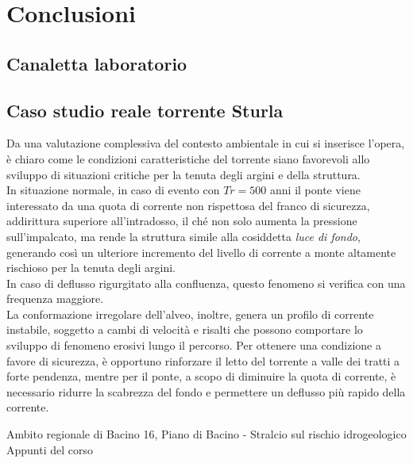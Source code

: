 \documentclass[12pt]{article} %
\begin{document}
\newpage
\section{Conclusioni}

\subsection{Canaletta laboratorio}

\subsection{Caso studio reale torrente Sturla}

\noindent Da una valutazione complessiva del contesto ambientale in cui si inserisce l'opera, è chiaro come le condizioni caratteristiche del torrente siano favorevoli allo sviluppo di situazioni critiche per la tenuta degli argini e della struttura.\\
In situazione normale, in caso di evento con $Tr=500$ anni il ponte viene interessato da una quota di corrente non rispettosa del franco di sicurezza, addirittura superiore all'intradosso, il ché non solo aumenta la pressione sull'impalcato, ma rende la struttura simile alla cosiddetta \textit{luce di fondo}, generando così un ulteriore incremento del livello di corrente a monte altamente rischioso per la tenuta degli argini.\\
In caso di deflusso rigurgitato alla confluenza, questo fenomeno si verifica con una frequenza maggiore.\\
La conformazione irregolare dell'alveo, inoltre, genera un profilo di corrente instabile, soggetto a cambi di velocità e risalti che possono comportare lo sviluppo di fenomeno erosivi lungo il percorso.
Per ottenere una condizione a favore di sicurezza, è opportuno rinforzare il letto del torrente a valle dei tratti a forte pendenza, mentre per il ponte, a scopo di diminuire la quota di corrente, è necessario ridurre la scabrezza del fondo e permettere un deflusso più rapido della corrente.

\newpage
\begin{thebibliography}{}
Ambito regionale di Bacino 16, Piano di Bacino - Stralcio sul rischio idrogeologico
Appunti del corso
\end{thebibliography}
\end{document}
